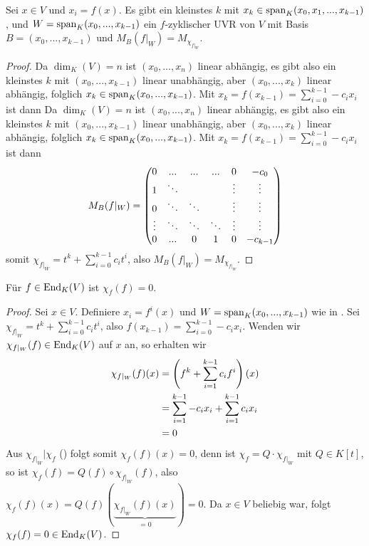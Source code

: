 \begin{lemma}
	Sei $x\in V$ und $x_i=f(x)$. Es gibt ein kleinstes $k$ mit $x_k\in\operatorname{span}_K(x_0,x_1,...,x_{k-1})$, und $W=\operatorname{span}_K(x_0,...,x_{k-1})$ ein $f$-zyklischer UVR von $V$ mit Basis $B=(x_0,...,x_{k-1})$ und $M_B(f\vert_W)=M_{\chi_{f\vert_W}}$.
\end{lemma}
\begin{proof}
	Da $\dim_K(V)=n$ ist $(x_0,...,x_n)$ linear abhängig, es gibt also ein kleinstes $k$ mit $(x_0,...,x_{k-1})$ linear unabhängig, aber $(x_0,...,x_k)$ linear abhängig, folglich $x_k\in\operatorname{span}_K(x_0,...,x_{k-1})$. Mit $x_k=f(x_{k-1})=\sum_{i=0}^{k-1}-c_ix_i$ ist dann 
	Da $\dim_K(V)=n$ ist $(x_0,...,x_n)$ linear abhängig, es gibt also ein kleinstes $k$ mit $(x_0,...,x_{k-1})$ linear unabhängig, aber $(x_0,...,x_k)$ linear abhängig, folglich $x_k\in\operatorname{span}_K(x_0,...,x_{k-1})$. Mit $x_k=f(x_{k-1})=\sum_{i=0}^{k-1}-c_ix_i$ ist dann 
	\begin{align}
		M_B(f\vert_W)=\begin{pmatrix}0&...&...&...&0&-c_0\\
		1&\ddots&\;&\;&\vdots&\vdots\\
		0&\ddots&\ddots&\;&\vdots&\vdots\\
		\vdots&\ddots&\ddots&\ddots&\vdots&\vdots\\
		0&...&0&1&0&-c_{k-1}\end{pmatrix}\notag
	\end{align}
	somit $\chi_{f\vert_W}=t^k+\sum_{i=0}^{k-1}c_it^i$, also $M_B(f\vert_W)=M_{\chi_{f\vert_W}}$.
\end{proof}

\begin{theorem}
	Für $f\in\operatorname{End}_K(V)$ ist $\chi_f(f)=0$.
\end{theorem}
\begin{proof}
	Sei $x\in V$. Definiere $x_i=f^i(x)$ und $W=\operatorname{span}_K(x_0,...,x_{k-1})$ wie in . Sei $\chi_{f\vert_W}=t^k+\sum_{i=0}^{k-1} c_it^i$, also $f(x_{k-1})=\sum_{i=0}^{k-1} -c_ix_i$. Wenden wir $\chi_{f\vert_W}(f)\in\operatorname{End}_K(V)$ auf $x$ an, so erhalten wir 
	\begin{align}
		\chi_{f\vert_W}(f)(x)&=\left( f^k+\sum\limits_{i=1}^{k-1} c_if^i\right)(x)\notag \\
		&= \sum\limits_{i=1}^{k-1} -c_ix_i+\sum\limits_{i=1}^{k-1}c_ix_i\notag \\
		&= 0\notag
	\end{align}
	Aus $\chi_{f\vert_W}\vert \chi_f$ () folgt somit $\chi_f(f)(x)=0$, denn ist $\chi_f=Q\cdot \chi_{f\vert_W}$ mit $Q\in K[t]$, so ist $\chi_f(f)=Q(f)\circ\chi_{f\vert_W}(f)$, also $\chi_f(f)(x)=Q(f)(\underbrace{\chi_{f\vert_W}(f)(x)}_{=0})=0$. Da $x\in V$ beliebig war, folgt $\chi_f(f)=0\in\operatorname{End}_K(V)$.
\end{proof}

